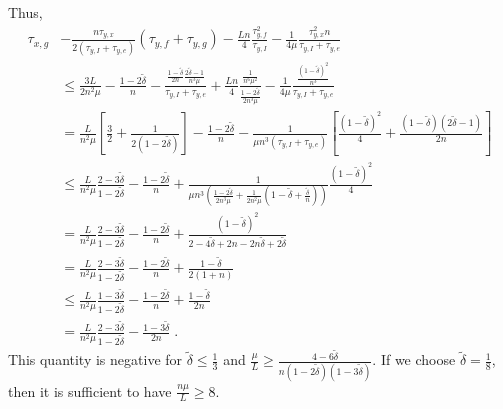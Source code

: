 \documentclass{article}
\begin{document}
Thus,
\begin{align*}
\tau_{x,g}&- \frac{n\tau_{y,x}}{2(\tau_{y,I} + \tau_{y,e})}(\tau_{y,f} + \tau_{y,g}) -\frac{Ln}{4}\frac{\tau_{y, f}^2}{\tau_{y,I}}-\frac{1}{4\mu}\frac{\tau_{y,x}^2n}{\tau_{y,I} + \tau_{y,e}}\\
&\leqslant \frac{3 L}{2n^2\mu} - \frac{1 - 2\widetilde{\delta}}{n} - \frac{\frac{1 - \widetilde{\delta}}{2n}\frac{2\widetilde{\delta} - 1}{n^3\mu}}{\tau_{y,I} + \tau_{y,e}} + \frac{Ln}{4}\frac{\frac{1}{n^6\mu^2}}{\frac{1 - 2\widetilde{\delta}}{2n^3\mu}} - \frac{1}{4\mu}\frac{\frac{(1 - \widetilde{\delta})^2}{n^3}}{\tau_{y,I} + \tau_{y,e}}\\
& = \frac{L}{n^2\mu}\left[\frac{3}{2} + \frac{1}{2(1 - 2\widetilde{\delta})}\right] - \frac{1 - 2\widetilde{\delta}}{n}- \frac{1}{\mu n^3 (\tau_{y,I} + \tau_{y,e})} \left[\frac{(1-\widetilde{\delta})^2}{4} + \frac{(1 - \widetilde{\delta})(2\widetilde{\delta} - 1)}{2n}\right]\\
& \leqslant \frac{L}{n^2\mu} \frac{2 - 3\widetilde{\delta}}{1 - 2\widetilde{\delta}} - \frac{1 - 2\widetilde{\delta}}{n}+ \frac{1}{\mu n^3 \left(\frac{1 - 2\widetilde{\delta}}{2n^3\mu} + \frac{1}{2n^2\mu}\left(1 - \widetilde{\delta} + \frac{\widetilde{\delta}}{n}\right)\right)}\frac{(1-\widetilde{\delta})^2}{4}\\
&= \frac{L}{n^2\mu} \frac{2 - 3\widetilde{\delta}}{1 - 2\widetilde{\delta}} - \frac{1 - 2\widetilde{\delta}}{n} + \frac{(1 - \widetilde{\delta})^2}{2 - 4\widetilde{\delta} + 2n - 2n\widetilde{\delta} + 2\widetilde{\delta}}\\
&= \frac{L}{n^2\mu} \frac{2 - 3\widetilde{\delta}}{1 - 2\widetilde{\delta}} - \frac{1 - 2\widetilde{\delta}}{n} + \frac{1 - \widetilde{\delta}}{2(1 + n)}\\
&\leqslant \frac{L}{n^2\mu} \frac{1 - 3\widetilde{\delta}}{1 - 2\widetilde{\delta}} - \frac{1 - 2\widetilde{\delta}}{n} + \frac{1 - \widetilde{\delta}}{2n}\\
& = \frac{L}{n^2\mu} \frac{2 - 3\widetilde{\delta}}{1 - 2\widetilde{\delta}} - \frac{1- 3\widetilde{\delta}}{2n} \; .
\end{align*}
This quantity is negative for $\widetilde{\delta} \leqslant \frac{1}{3}$ and $\frac{\mu}{L} \geqslant \frac{4 - 6\widetilde{\delta}}{n(1 - 2\widetilde{\delta})(1 - 3\widetilde{\delta})}$.
If we choose $\widetilde{\delta} = \frac{1}{8}$, then it is sufficient to have $\frac{n\mu}{L} \geqslant 8$.
\end{document}
